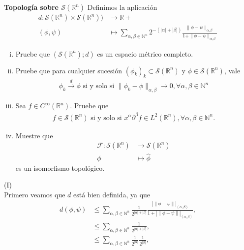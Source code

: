 \begin{homeworkProblem}
  \textbf{Topología sobre $\mathcal{S}(\mathbb{R}^{n})$} Definimos la aplicación
  \begin{align*}
    d : \mathcal{S}(\mathbb{R}^{n}) \times \mathcal{S}(\mathbb{R}^{n})) &\longrightarrow \mathbb{R}+\\
    (\phi, \psi) &\longmapsto \sum_{\alpha, \beta \in \mathbb{N}^{n}} 2^{-(|\alpha| + |\beta|)} \frac{\|\phi - \psi\|_{\alpha, \beta}}{1 + \|\phi - \psi\|_{\alpha, \beta}}
  \end{align*}
  \begin{enumerate}[(i)]
    \item Pruebe que $(\mathcal{S}(\mathbb{R}^{n}); d)$ es un espacio métrico completo.
    \item Pruebe que para cualquier sucesión $(\phi_k)_k \subset \mathcal{S}(\mathbb{R}^{n})$ y $\phi \in \mathcal{S}(\mathbb{R}^{n})$, vale
      \begin{align*}
        \phi_k \overset{d}{\to} \phi \text{ si y solo si } \|\phi_k - \phi\|_{\alpha, \beta} \to 0, \forall \alpha, \beta \in \mathbb{N}^{n}
      \end{align*}
    \item Sea $f \in C^\infty(\mathbb{R}^{n})$. Pruebe que
      \begin{align*}
        f \in \mathcal{S}(\mathbb{R}^{n}) \text{ si y solo si } x^{\alpha} \partial^{\beta}f \in L^2(\mathbb{R}^{n}), \forall \alpha, \beta \in \mathbb{N}^{n}.
      \end{align*}
    \item Muestre que
      \begin{align*}
        \mathcal{F} : \mathcal{S}(\mathbb{R}^{n}) &\longrightarrow \mathcal{S}(\mathbb{R}^{n})\\
        \phi &\longmapsto \hat{\phi}
      \end{align*}
      es un isomorfismo topológico.
  \end{enumerate}
  \begin{solution}
    (I)\\
    Primero veamos que $d$ está bien definida, ya que
    \begin{align*}
			d(\phi,\psi)&\leq\sum_{\alpha,\beta\in \mathbb{N}^{n}}\frac{1}{2^{|\alpha|+|\beta|}}\frac{|\|\phi-\psi\||_{(\alpha,\beta)}}{1+|\|\phi-\psi\||_{(\alpha,\beta)}},\\
			&\leq \sum_{\alpha,\beta\in\mathbb{N}^{n}}\frac{1}{2^{|\alpha|+|\beta|}},\\
			&\leq \sum_{\alpha,\beta\in\mathbb{N}^{n}}\frac{1}{2^{|\alpha|}}\frac{1}{2^{|\beta|}},\\

\end{align*}
\end{solution}
\end{homeworkProblem}
